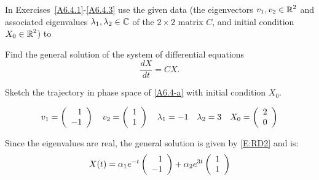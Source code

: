 \documentclass{ximera}
\begin{document}
\AEXER


In Exercises~\ref{A6.4.1}-\ref{A6.4.3} use the given data (the eigenvectors 
$v_1,v_2\in\mbox{$\Bbb{R}$}^2$ and associated eigenvalues $\lambda_1,\lambda_2\in\mbox{$\Bbb{C}$}$
of the $2\times 2$ matrix $C$, and initial condition $X_0\in\mbox{$\Bbb{R}$}^2$) to   
\begin{enumeratea}
\item Find the general solution of the system of differential equations 
\begin{equation} \label{A6.4-a}
\frac{dX}{dt} = CX. 
\end{equation}
\item Sketch the trajectory in phase space of \eqref{A6.4-a} with initial condition $X_0$.
\end{enumeratea}

\begin{exercise} \label{A6.4.1}
\[
v_1 = \left(\begin{array}{rrrrrrrrrrrrrrrrrr}  1 \\ -1 \end{array}\right) \quad  v_2 = \left(\begin{array}{rrrrrrrrrrrrrrrrrr}  1 \\ 1  \end{array}\right)\quad  \lambda_1 = -1\quad \lambda_2 = 3\quad  X_0 = \left(\begin{array}{rrrrrrrrrrrrrrrrrr} 2 \\ 0  \end{array}\right)
\]

\begin{solution}
\soln Since the eigenvalues are real, the general solution is given by \eqref{E:RD2} and is:
\[
X(t) = \alpha_1 e^{-t} \left(\begin{array}{rrrrrrrrrrrrrrrrrr}  1 \\ -1 \end{array}\right) + \alpha_2 e^{3t}\left(\begin{array}{rrrrrrrrrrrrrrrrrr}  1 \\ 1  \end{array}\right)
\]
 
\begin{figure}[htb]
           \centerline{%
           }
\end{figure}

\end{solution}
\end{exercise}
\end{document}
